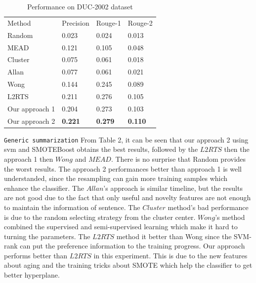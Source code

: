 \documentclass[print]{jicspack}
\begin{document}
\begin{table}
\caption{Performance on DUC-2002 dataset}
\centering
\begin{tabular}{llll}
\hline\noalign{\smallskip}
Method   &  Precision    & Rouge-1  				& Rouge-2 \\
\noalign{\smallskip}
\hline
\noalign{\smallskip}
Random & 0.023 			& 		0.024 			&  0.013 \\
MEAD    &	0.121			& 		0.105	 			&	0.048					 				\\
Cluster	&	0.075			&		0.061				&	0.018					 				\\
Allan		&	0.077			&		0.061				&	0.021						 			\\
Wong		&	0.144			&		0.245				&	0.089									\\
L2RTS	&	0.211			&		0.276				&	0.105						 			\\
Our approach 1	&	0.204	&		0.273			&	0.103 \\
Our approach 2	&	\textbf{0.221}	&		\textbf{0.279}				&	\textbf{0.110}	 \\
\hline
\end{tabular}
\end{table}

\texttt{Generic summarization} From Table 2, it can be seen that our approach 2 using svm and SMOTEBoost obtains the best results, followed by the $L2RTS$ then the approach 1 then $Wong$ and $MEAD$. 
There is no surprise that Random provides the worst results. 
The approach 2 performances better than approach 1 is well understanded, since the resampling can gain more training samples which enhance the classifier.
The $Allan$'s approach is similar timeline, but the results are not good due to the fact that only useful and novelty features are not enough to maintain the information of sentence. 
The $Cluster$ method's bad performance is due to the random selecting strategy from the cluster center.
$Wong$'s method combined the supervised and semi-supervised learning which make it hard to turning the parameters.
The $L2RTS$ method it better than Wong since the SVM-rank can put the preference information to the training progress.
Our approach performs better than $L2RTS$ in this experiment. This is due to the new features about aging and the training tricks about SMOTE which help the classifier to get better hyperplane.
\end{document}
